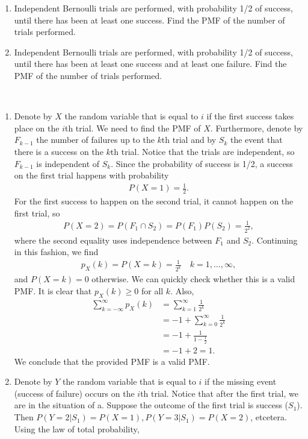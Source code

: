 
\setcounter{theorem}{1}
\begin{exercise}[BH.3.2]
	\begin{enumerate}
		\item Independent Bernoulli trials are performed, with probability 1/2 of success, until there has been at least one success. Find the PMF of the number of trials performed.
		\item Independent Bernoulli trials are performed, with probability 1/2 of success, until there has been at least one success and at least one failure. Find the PMF of the number of trials performed.
	\end{enumerate}
\begin{solution}~
	\begin{enumerate}
		\item Denote by $X$ the random variable that is equal to $i$ if the first success takes place on the $i$th trial. We need to find the PMF of $X$. Furthermore, denote by $F_{k-1}$ the number of failures up to the $k$th trial and by $S_{k}$ the event that there is a success on the $k$th trial. Notice that the trials are independent, so $F_{k-1}$ is independent of $S_{k}$. Since the probability of success is 1/2, a success on the first trial happens with probability
		\begin{align*}
			P(X=1) = \frac{1}{2}.
		\end{align*}
		For the first success to happen on the second trial, it cannot happen on the first trial, so
		\begin{align*}
			P(X=2) = P(F_{1}\cap S_{2}) = P(F_{1})P(S_{2}) = \frac{1}{2^2},
		\end{align*}
		where the second equality uses independence between $F_{1}$ and $S_{2}$.
		Continuing in this fashion, we find
		\begin{align*}
			p_{X}(k)=	P(X=k) = \frac{1}{2^k}\quad k=1,\ldots,\infty,
		\end{align*}
		and $P(X=k)=0$ otherwise. We can quickly check whether this is a valid PMF. It is clear that $p_{X}(k)\geq 0$ for all $k$. Also,
		\begin{align*}
			\sum_{k=-\infty}^{\infty}p_{X}(k) &= \sum_{k=1}^{\infty}\frac{1}{2^k}\\
			&= -1+\sum_{k=0}^{\infty}\frac{1}{2^k}\\
			&= -1+\frac{1}{1-\frac{1}{2}}\\
			&=-1+2 =1.
		\end{align*}
		We conclude that the provided PMF is a valid PMF.
		\item Denote by $Y$ the random variable that is equal to $i$ if the missing event (success of failure) occurs on the $i$th trial. Notice that after the first trial, we are in the situation of a. Suppose the outcome of the first trial is success ($S_{1}$). Then $P(Y=2|S_{1}) = P(X=1), P(Y=3|S_{1}) = P(X=2)$, etcetera. Using the law of total probability,

\end{enumerate}
\end{solution}
\end{exercise}
